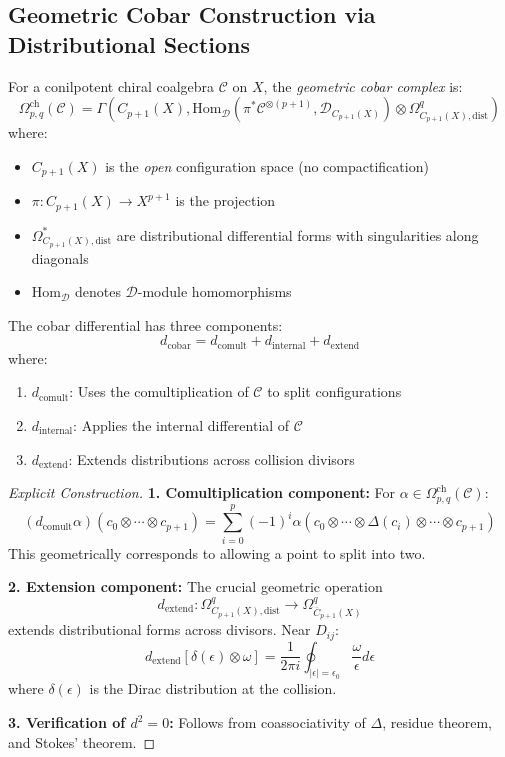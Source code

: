 \subsection{Geometric Cobar Construction via Distributional Sections}

\begin{definition}\label{def:geom-cobar}
For a conilpotent chiral coalgebra $\mathcal{C}$ on $X$, the \emph{geometric cobar complex} is:
\[
\Omega^{\text{ch}}_{p,q}(\mathcal{C}) = \Gamma\left(C_{p+1}(X), \text{Hom}_{\mathcal{D}}(\pi^*\mathcal{C}^{\otimes(p+1)}, \mathcal{D}_{C_{p+1}(X)}) \otimes \Omega^q_{C_{p+1}(X),\text{dist}}\right)
\]
where:
\begin{itemize}
\item $C_{p+1}(X)$ is the \emph{open} configuration space (no compactification)
\item $\pi: C_{p+1}(X) \to X^{p+1}$ is the projection
\item $\Omega^*_{C_{p+1}(X),\text{dist}}$ are distributional differential forms with singularities along diagonals
\item $\text{Hom}_{\mathcal{D}}$ denotes $\mathcal{D}$-module homomorphisms
\end{itemize}
\end{definition}

\begin{theorem}\label{thm:cobar-diff-geom}
The cobar differential has three components:
\[
d_{\text{cobar}} = d_{\text{comult}} + d_{\text{internal}} + d_{\text{extend}}
\]
where:
\begin{enumerate}
\item $d_{\text{comult}}$: Uses the comultiplication of $\mathcal{C}$ to split configurations
\item $d_{\text{internal}}$: Applies the internal differential of $\mathcal{C}$
\item $d_{\text{extend}}$: Extends distributions across collision divisors
\end{enumerate}
\end{theorem}

\begin{proof}[Explicit Construction]
\textbf{1. Comultiplication component:} For $\alpha \in \Omega^{\text{ch}}_{p,q}(\mathcal{C})$:
\[
(d_{\text{comult}}\alpha)(c_0 \otimes \cdots \otimes c_{p+1}) = \sum_{i=0}^{p} (-1)^i \alpha(c_0 \otimes \cdots \otimes \Delta(c_i) \otimes \cdots \otimes c_{p+1})
\]
This geometrically corresponds to allowing a point to split into two.

\textbf{2. Extension component:} The crucial geometric operation
\[
d_{\text{extend}}: \Omega^q_{C_{p+1}(X),\text{dist}} \to \Omega^q_{\overline{C}_{p+1}(X)}
\]
extends distributional forms across divisors. Near $D_{ij}$:
\[
d_{\text{extend}}[\delta(\epsilon) \otimes \omega] = \frac{1}{2\pi i} \oint_{|\epsilon|=\epsilon_0} \frac{\omega}{\epsilon} d\epsilon
\]
where $\delta(\epsilon)$ is the Dirac distribution at the collision.

\textbf{3. Verification of $d^2 = 0$:} Follows from coassociativity of $\Delta$, residue theorem, and Stokes' theorem.
\end{proof}

